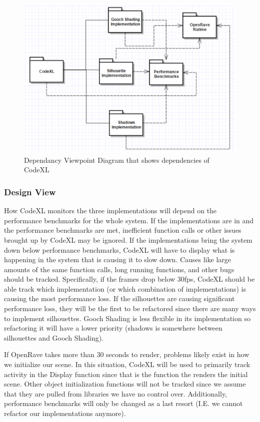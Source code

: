 \documentclass[10pt,journal,compsoc,draftclsnofoot]{IEEEtran}
\begin{document}
\begin{flushleft}
\begin{figure} [H]
  \includegraphics[scale=0.9]{CodeXL_Dependency.eps}
  \caption
{ \newline \hspace{\linewidth}
Dependancy Viewpoint Diagram that shows dependencies of CodeXL}
  \label{fig:CodeXL_Dependency}
\end{figure}

\subsubsection{Design View}
How CodeXL monitors the three implementations will depend on the performance benchmarks for the whole system.
If the implementations are in and the performance benchmarks are met, inefficient function calls or other issues brought up by CodeXL may be ignored.
If the implementations bring the system down below performance benchmarks, CodeXL will have to display what is happening in the system that is causing it to slow down.
Causes like large amounts of the same function calls, long running functions, and other bugs should be tracked.
Specifically, if the frames drop below 30fps, CodeXL should be able track which implementation (or which combination of implementations) is causing the most performance loss.
If the silhouettes are causing significant performance loss, they will be the first to be refactored since there are many ways to implement silhouettes. 
Gooch Shading is less flexible in its implementation so refactoring it will have a lower priority (shadows is somewhere between silhouettes and Gooch Shading).

If OpenRave takes more than 30 seconds to render, problems likely exist in how we initialize our scene.
In this situation, CodeXL will be used to primarily track activity in the Display function since that is the function the renders the initial scene.
Other object initialization functions will not be tracked since we assume that they are pulled from libraries we have no control over.
Additionally, performance benchmarks will only be changed as a last resort (I.E. we cannot refactor our implementations anymore).


\end{flushleft}
\end{document}
